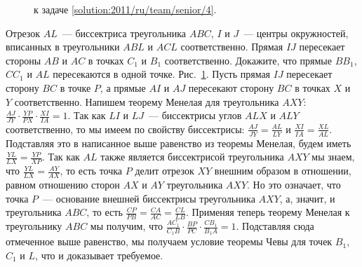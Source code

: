 \ifsolution
\begin{figure}\centering
    \caption{к задаче \ref{solution:2011/ru/team/senior/4}.}
    \label{fig:solution:2011/ru/team/senior/4}
\end{figure}
\fi %

\problem{}
Отрезок $AL$~--- биссектриса треугольника $ABC$, $I$ и $J$~--- центры
окружностей, вписанных в треугольники $ABL$ и $ACL$ соответственно.
Прямая $IJ$ пересекает стороны $AB$ и $AC$ в точках $C_1$ и $B_1$
соответственно.
Докажите, что прямые $B B_1$, $C C_1$ и $AL$ пересекаются в одной точке.
\solution
\label{solution:2011/ru/team/senior/4}%
Рис.~\ref{fig:solution:2011/ru/team/senior/4}.
Пусть прямая $IJ$ пересекает сторону $BC$ в точке $P$, а прямые $AI$ и $AJ$
пересекают сторону $BC$ в точках $X$ и $Y$ соответственно.
Напишем теорему Менелая для треугольника $AXY$:
\(
    \frac{AJ}{JY}
    \cdot
    \frac{YP}{PX}
    \cdot
    \frac{XI}{IA}
=
    1
\).
Так как $LI$ и $LJ$~--- биссектрисы углов $ALX$ и $ALY$ соответственно, то мы
имеем по свойству биссектрисы:
$\frac{AJ}{JY} = \frac{AL}{LY}$ и $\frac{XI}{IA} = \frac{XL}{AL}$.
Подставляя это в написанное выше равенство из теоремы Менелая, будем иметь
$\frac{YL}{LX} = \frac{YP}{XP}$.
Так как $AL$ также является биссектрисой треугольника $AXY$ мы знаем, что
$\frac{YL}{LX} = \frac{AY}{AX}$, то есть точка $P$ делит отрезок $XY$ внешним
образом в отношении, равном отношению сторон $AX$ и $AY$ треугольника $AXY$.
Но это означает, что точка $P$~--- основание внешней биссектрисы треугольника
$AXY$, а, значит, и треугольника $ABC$, то есть
$\frac{CP}{PB} = \frac{CA}{AC} = \frac{CL}{LB}$.
Применяя теперь теорему Менелая к треугольнику $ABC$ мы получим, что
\(
    \frac{A C_1}{C_1 B}
    \cdot
    \frac{BP}{PC}
    \cdot
    \frac{C B_1}{B_1 A}
=
    1
\).
Подставляя сюда отмеченное выше равенство, мы получаем условие теоремы Чевы для
точек $B_1$, $C_1$ и $L$, что и доказывает требуемое.
\endproblem
